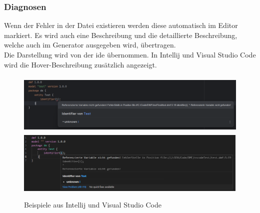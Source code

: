 \documentclass[./einleitung.tex]{subfiles}
\begin{document}
    \subsubsection{Diagnosen}\label{subsubsec:useDiagnosen}
    Wenn der Fehler in der Datei existieren werden diese automatisch im Editor markiert.
    Es wird auch eine Beschreibung und die detaillierte Beschreibung, welche auch im Generator ausgegeben wird, übertragen.\\
    Die Darstellung wird von der \acrshort{ide} übernommen.
    In Intellij und Visual Studio Code wird die Hover-Beschreibung zusätzlich angezeigt.\\
    \begin{figure}[H]
        \centering
        \includegraphics[keepaspectratio,height=8em]{bilder/markierung-fehler-intellij}
        \includegraphics[keepaspectratio,height=8em]{bilder/markierung-fehler-vscode}
        \caption{Beispiele aus Intellij und Visual Studio Code}
        \label{fig:markierung-fehler-intellij}
    \end{figure}
\end{document}
